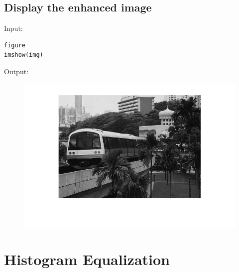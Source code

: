 \documentclass[12pt, a4paper]{article}
\begin{document}
\subsection{Display the enhanced image}
Input:
\begin{verbatim}
figure
imshow(img)
\end{verbatim}
Output:
\begin{figure}[ht]
	\centering
	\includegraphics[width=\textwidth]{fig2.png}
\end{figure}

\section{Histogram Equalization}
\end{document}
